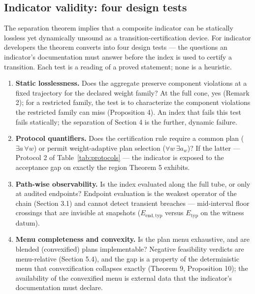 \documentclass[3p,11pt]{elsarticle}
\providecommand{\tightlist}{\setlength{\itemsep}{0pt}\setlength{\parskip}{0pt}}
\begin{document}
\subsection{Indicator validity: four design tests}\label{indicator-validity}

The separation theorem implies that a composite indicator can be
statically lossless yet dynamically unsound as a
transition-certification device. For indicator developers the theorem
converts into four design tests --- the questions an indicator's
documentation must answer before the index is used to certify a
transition. Each test is a reading of a proved statement; none is a
heuristic.

\begin{enumerate}
\tightlist
\item
  \textbf{Static losslessness.} Does the aggregate preserve component
  violations at a fixed trajectory for the declared weight family? At the
  full cone, yes (Remark 2); for a restricted family, the test is to
  characterize the component violations the restricted family can miss
  (Proposition 4). An index that fails this test fails statically; the
  separation of Section 4 is the further, dynamic failure.
\item
  \textbf{Protocol quantifiers.} Does the certification rule require a
  common plan (\(\exists a\, \forall w\)) or permit weight-adaptive plan
  selection (\(\forall w\, \exists a_w\))? If the latter --- Protocol 2
  of Table~\ref{tab:protocols} --- the indicator is exposed to the
  acceptance gap on exactly the region Theorem 5 exhibits.
\item
  \textbf{Path-wise observability.} Is the index evaluated along the
  full tube, or only at audited endpoints? Endpoint evaluation is the
  weakest operator of the chain (Section 3.1) and cannot detect transient
  breaches --- mid-interval floor crossings that are invisible at
  snapshots (\(E_{\mathrm{end,typ}}\) versus \(E_{\mathrm{typ}}\) on
  the witness datum).
\item
  \textbf{Menu completeness and convexity.} Is the plan menu exhaustive,
  and are blended (convexified) plans implementable? Negative feasibility
  verdicts are menu-relative (Section 5.4), and the gap is a property of
  the deterministic menu that convexification collapses exactly (Theorem
  9, Proposition 10); the availability of the convexified menu is
  external data that the indicator's documentation must declare.
\end{enumerate}
\end{document}
